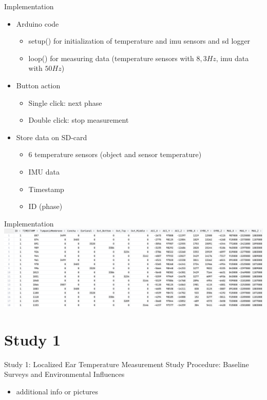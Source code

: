 \documentclass[en]{sdqbeamer}
\begin{document}
\begin{frame}{Implementation}
    \begin{itemize}
        \item Arduino code
        \begin{itemize}
            \item setup() for initialization of temperature and imu sensors and sd logger
            \item loop() for measuring data (temperature sensors with $8,3Hz$, imu data with $50Hz$)
        \end{itemize}
        \item Button action
        \begin{itemize}
            \item Single click: next phase
            \item Double click: stop measurement
        \end{itemize}
        \item Store data on SD-card
        \begin{itemize}
            \item 6 temperature sensors (object and sensor temperature)
            \item IMU data
            \item Timestamp
            \item ID (phase)
        \end{itemize}
    \end{itemize}
\end{frame}

\begin{frame}{Implementation}
    \includegraphics[width=0.75\linewidth]{../thesis-doc/images/prototype/MeasurementRawDataSnippet_short.png} %
\end{frame}

\section{Study 1}
\begin{frame}{Study 1: Localized Ear Temperature Measurement Study Procedure: Baseline Surveys and Environmental Influences}
    \begin{itemize}
        \item additional info or pictures
    \end{itemize}
\end{frame}
\end{document}

